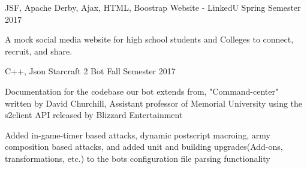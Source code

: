 


\begin{cventries}


\cventry
{JSF, Apache Derby, Ajax, HTML, Boostrap} %
{Website - LinkedU} %
{} %
{Spring Semester 2017} %
{ %
\begin{cvitems}
\item {A mock social media website for high school students and Colleges to connect, recruit, and share.}
\end{cvitems}
}


\cventry
{ C++, Json} %
{Starcraft 2 Bot} %
{} %
{Fall Semester 2017} %
{ %
\begin{cvitems}
\item { Documentation for the codebase our bot extends from, "Command-center" written by David Churchill, Assistant professor of Memorial University using the s2client API released by Blizzard Entertainment}
\item {Added in-game-timer based attacks, dynamic postscript macroing, army composition  based attacks, and added unit and building upgrades(Add-ons, transformations, etc.) to the bots configuration file parsing functionality}
\end{cvitems}
}



\end{cventries}